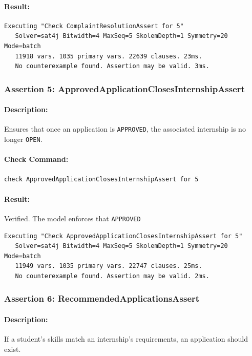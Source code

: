 \paragraph{Result:} 
\begin{verbatim}
Executing "Check ComplaintResolutionAssert for 5"
   Solver=sat4j Bitwidth=4 MaxSeq=5 SkolemDepth=1 Symmetry=20 Mode=batch
   11918 vars. 1035 primary vars. 22639 clauses. 23ms.
   No counterexample found. Assertion may be valid. 3ms.
\end{verbatim}

\subsubsection{Assertion 5: ApprovedApplicationClosesInternshipAssert}
\paragraph{Description:} Ensures that once an application is \texttt{APPROVED}, the associated internship is no longer \texttt{OPEN}.
\paragraph{Check Command:}
\begin{verbatim}
check ApprovedApplicationClosesInternshipAssert for 5
\end{verbatim}
\paragraph{Result:} Verified. The model enforces that \texttt{APPROVED} 
\begin{verbatim}
Executing "Check ApprovedApplicationClosesInternshipAssert for 5"
   Solver=sat4j Bitwidth=4 MaxSeq=5 SkolemDepth=1 Symmetry=20 Mode=batch
   11949 vars. 1035 primary vars. 22747 clauses. 25ms.
   No counterexample found. Assertion may be valid. 2ms.
\end{verbatim}
\subsubsection{Assertion 6: RecommendedApplicationsAssert}
\paragraph{Description:} If a student’s skills match an internship’s requirements, an application should exist.

